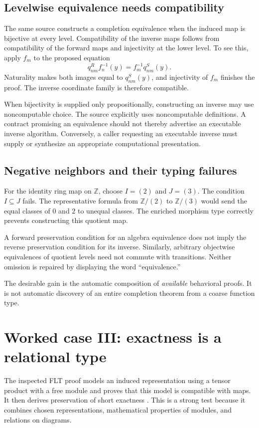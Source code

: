 \documentclass[11pt,a4paper]{article}
\newcommand{\Z}{\mathbb Z}\newcommand{\N}{\mathbb N}
\theoremstyle{plain}
\theoremstyle{definition}
\theoremstyle{remark}
\begin{document}
\subsection{Levelwise equivalence needs compatibility}
The same source constructs a completion equivalence when the induced map is
bijective at every level. Compatibility of the inverse maps follows from
compatibility of the forward maps and injectivity at the lower level. To see
this, apply $f_m$ to the proposed equation
\[
 q^R_{nm}f_n^{-1}(y)=f_m^{-1}q^S_{nm}(y).
\]
Naturality makes both images equal to $q^S_{nm}(y)$, and injectivity of $f_m$
finishes the proof. The inverse coordinate family is therefore compatible.

When bijectivity is supplied only propositionally, constructing an inverse
may use noncomputable choice. The source explicitly uses noncomputable
definitions. A contract promising an equivalence should not thereby advertise
an executable inverse algorithm. Conversely, a caller requesting an executable
inverse must supply or synthesize an appropriate computational presentation.

\subsection{Negative neighbors and their typing failures}
For the identity ring map on $\Z$, choose $I=(2)$ and $J=(3)$. The condition
$I\subseteq J$ fails. The representative formula from $\Z/(2)$ to
$\Z/(3)$ would send the equal classes of $0$ and $2$ to unequal classes.
The enriched morphism type correctly prevents constructing this quotient map.

A forward preservation condition for an algebra equivalence does not imply the
reverse preservation condition for its inverse. Similarly, arbitrary
objectwise equivalences of quotient levels need not commute with transitions.
Neither omission is repaired by displaying the word ``equivalence.''

The desirable gain is the automatic composition of \emph{available} behavioral
proofs. It is not automatic discovery of an entire completion theorem from a
coarse function type.

\section{Worked case III: exactness is a relational type}
\label{sec:exactness}
The inspected FLT proof models an induced representation using a tensor
product with a free module and proves that this model is compatible with maps.
It then derives preservation of short exactness
\cite{exactsource}. This is a strong test because it combines chosen
representations, mathematical properties of modules, and relations on diagrams.
\end{document}
